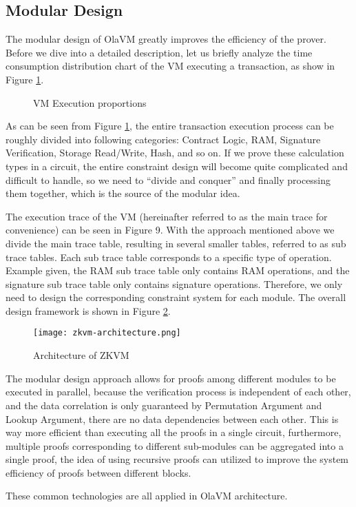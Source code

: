 \subsection{Modular Design}

The modular design of OlaVM greatly improves the efficiency of the prover. Before we dive into a detailed description, let us briefly analyze the time consumption distribution chart of the VM executing a transaction, as show in Figure \ref{fig:vm-execution-proportion}.

\begin{figure}[!ht]
    \centering
    \caption{VM Execution proportions} \label{fig:vm-execution-proportion}
\end{figure}

As can be seen from Figure \ref{fig:vm-execution-proportion}, the entire transaction execution process can be roughly divided into following categories: Contract Logic, RAM, Signature Verification, Storage Read/Write, Hash, and so on. If we prove these calculation types in a circuit, the entire constraint design will become quite complicated and difficult to handle, so we need to ``divide and conquer'' and finally processing them together, which is the source of the modular idea.

The execution trace of the VM (hereinafter referred to as the main trace for convenience) can be seen in Figure 9. With the approach mentioned above we divide the main trace table, resulting in several smaller tables, referred to as sub trace tables. Each sub trace table corresponds to a specific type of operation. Example given, the RAM sub trace table only contains RAM operations, and the signature sub trace table only contains signature operations. Therefore, we only need to design the corresponding constraint system for each module. The overall design framework is shown in Figure \ref{fig:zkvm-architecture}.

\begin{figure}[!ht]
    \centering
    \texttt{[image: zkvm-architecture.png]}
    \caption{Architecture of ZKVM}
    \label{fig:zkvm-architecture}
\end{figure}

The modular design approach allows for proofs among different modules to be executed in parallel, because the verification process is independent of each other, and the data correlation is only guaranteed by Permutation Argument and Lookup Argument, there are no data dependencies between each other. This is way more efficient than executing all the proofs in a single circuit, furthermore, multiple proofs corresponding to different sub-modules can be aggregated into a single proof, the idea of using recursive proofs can utilized to improve the system efficiency of proofs between different blocks.

These common technologies are all applied in OlaVM architecture.
